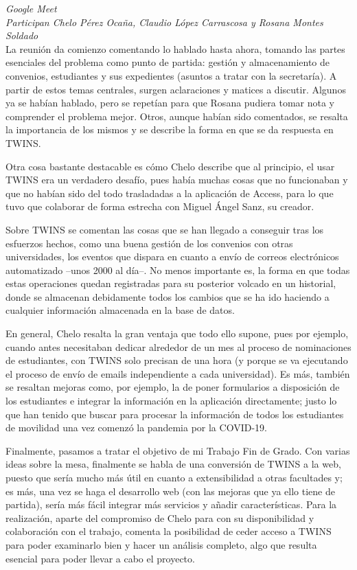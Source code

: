 \begin{appendices}
	\textit{Google Meet}\\
	
	\textit{Participan Chelo Pérez Ocaña, Claudio López Carrascosa y Rosana Montes Soldado}\\
	
	La reunión da comienzo comentando lo hablado hasta ahora, tomando las partes esenciales del problema como punto de partida: gestión y almacenamiento de convenios, estudiantes y sus expedientes (asuntos a tratar con la secretaría). A partir de estos temas centrales, surgen aclaraciones y matices a discutir. Algunos ya se habían hablado, pero se repetían para que Rosana pudiera tomar nota y comprender el problema mejor. Otros, aunque habían sido comentados, se resalta la importancia de los mismos y se describe la forma en que se da respuesta en TWINS.
	
	Otra cosa bastante destacable es cómo Chelo describe que al principio, el usar TWINS era un verdadero desafío, pues había muchas cosas que no funcionaban y que no habían sido del todo trasladadas a la aplicación de Access, para lo que tuvo que colaborar de forma estrecha con Miguel Ángel Sanz, su creador.
	
	Sobre TWINS se comentan las cosas que se han llegado a conseguir tras los esfuerzos hechos, como una buena gestión de los convenios con otras universidades, los eventos que dispara en cuanto a envío de correos electrónicos automatizado --unos 2000 al día--. No menos importante es, la forma en que todas estas operaciones quedan registradas para su posterior volcado en un historial, donde se almacenan debidamente todos los cambios que se ha ido haciendo a cualquier información almacenada en la base de datos.
	
	En general, Chelo resalta la gran ventaja que todo ello supone, pues por ejemplo, cuando antes necesitaban dedicar alrededor de un mes al proceso de nominaciones de estudiantes, con TWINS solo precisan de una hora (y porque se va ejecutando el proceso de envío de emails independiente a cada universidad). Es más, también se resaltan mejoras como, por ejemplo, la de poner formularios a disposición de los estudiantes e integrar la información en la aplicación directamente; justo lo que han tenido que buscar para procesar la información de todos los estudiantes de movilidad una vez comenzó la pandemia por la COVID-19.
	
	Finalmente, pasamos a tratar el objetivo de mi Trabajo Fin de Grado. Con varias ideas sobre la mesa, finalmente se habla de una conversión de TWINS a la web, puesto que sería mucho más útil en cuanto a extensibilidad a otras facultades y; es más, una vez se haga el desarrollo web (con las mejoras que ya ello tiene de partida), sería más fácil integrar más servicios y añadir características. Para la realización, aparte del compromiso de Chelo para con su disponibilidad y colaboración con el trabajo, comenta la posibilidad de ceder acceso a TWINS para poder examinarlo bien y hacer un análisis completo, algo que resulta esencial para poder llevar a cabo el proyecto.
	

\end{appendices}
